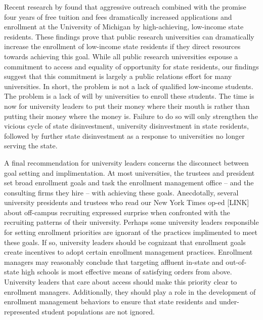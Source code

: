 \documentclass[twoside]{article}
\begin{document}
Recent research by \cite{RN4408} found that aggressive outreach combined with the promise four years of free tuition and fees dramatically increased applications and enrollment at the University of Michigan by high-achieving, low-income state residents.  These findings prove that public research universities can dramatically increase the enrollment of low-income state residents if they direct resources towards achieving this goal.  While all public research universities espouse a commitment to access and equality of opportunity for state residents, our findings suggest that this commitment is largely a public relations effort for many universities. In short, the problem is not a lack of qualified low-income students. The problem is a lack of will by universities to enroll these students.  The time is now for university leaders to put their money where their mouth is rather than putting their money where the money is.  Failure to do so will only strengthen the vicious cycle of state disinvestment, university disinvestment in state residents, followed by further state disinvestment as a response to universities no longer serving the state.

A final recommendation for university leaders concerns the disconnect between goal setting and implimentation.  At most universities, the trustees and president set broad enrollment goals and task the enrollment management office -- and the consulting firms they hire -- with achieving these goals. Anecdotally, several university presidents and trustees who read our New York Times op-ed [LINK] about off-campus recruiting expressed surprise when confronted with the recruiting patterns of their university.  Perhaps some university leaders responsible for setting enrollment priorities are ignorant of the practices implimented to meet these goals.  If so, university leaders should be cognizant that enrollment goals create incentives to adopt certain enrollment management practices. Enrollment managers may reasonably conclude that targeting affluent in-state and out-of-state high schools is most effective means of satisfying orders from above.  University leaders that care about access should make this priority clear to enrollment managers. Additionally, they should play a role in the development of enrollment management behaviors to ensure that state residents and under-represented student populations are not ignored.
\end{document}
